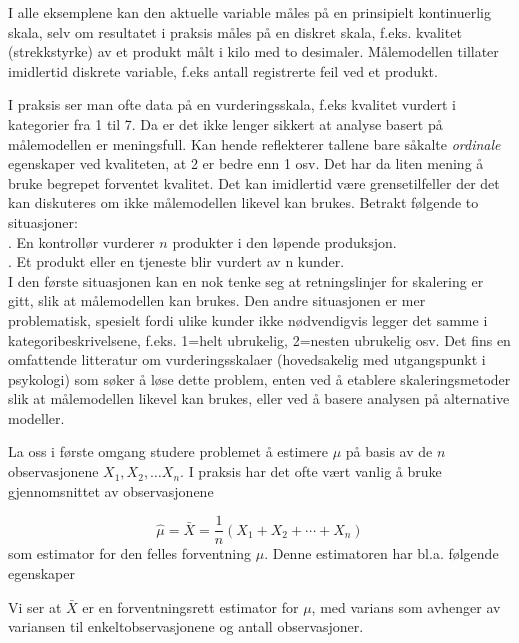 I alle eksemplene kan den aktuelle variable måles på en
prinsipielt kontinuerlig skala, selv om resultatet i praksis 
måles på en diskret skala, f.eks. kvalitet (strekkstyrke)
av et produkt målt i kilo med to desimaler. Målemodellen
tillater imidlertid diskrete variable, f.eks antall registrerte feil
ved et produkt.

I praksis ser man ofte data på en vurderingsskala, f.eks kvalitet
vurdert i kategorier fra 1 til 7. Da er det ikke lenger sikkert at
analyse basert på målemodellen er meningsfull. Kan hende
reflekterer tallene bare såkalte {\em ordinale} egenskaper ved
kvaliteten, at 2 er bedre enn 1 osv. Det har da liten mening å
bruke begrepet forventet kvalitet. Det kan imidlertid være 
grensetilfeller der det kan diskuteres om ikke målemodellen
likevel kan brukes. Betrakt følgende to situasjoner:\\
. En kontrollør vurderer $n$ produkter i den 
løpende produksjon.\\
. Et produkt eller en tjeneste blir vurdert av n kunder.\\
I den første situasjonen kan en nok tenke seg at retningslinjer for
skale\-ring er gitt, slik at målemodellen kan brukes. Den andre
situasjonen er mer problematisk, spesielt fordi ulike kunder ikke
nødvendigvis legger det samme i kategoribeskrivelsene, f.eks.
1=helt ubrukelig, 2=nesten ubrukelig osv.
Det fins en omfattende litteratur om vurderingsskalaer
(hovedsakelig med utgangspunkt i psykologi) som søker å
løse dette problem, enten ved å etablere skaleringsmetoder
slik at målemodellen likevel kan brukes, eller ved å
basere analysen på alternative modeller.
  
La oss i første omgang studere problemet å estimere $\mu$
på basis av de $n$ observasjonene $X_1,X_2,\ldots X_n$. I
praksis har det ofte vært vanlig å bruke gjennomsnittet
av observasjonene

\[  \hat{\mu}=\bar{X}=\frac{1}{n}(X_1+X_2+\cdots +X_n) \]
som estimator for den felles forventning $\mu$.  Denne estimatoren har bl.a.
følgende egenskaper
\begin{center} \framebox[10cm]{\begin{minipage}{9cm}
\[  E(\bar{X})=\mu \mbox{\ \ \ \ \ \ \ \ } var(\bar{X})=\frac{\sigma ^2}{n} \]
\mbox{}
\end{minipage}} \end{center}
Vi ser at $\bar X$ er en forventningsrett estimator for $\mu$, med varians
som avhenger av variansen til enkeltobservasjonene og antall observasjoner.\\

